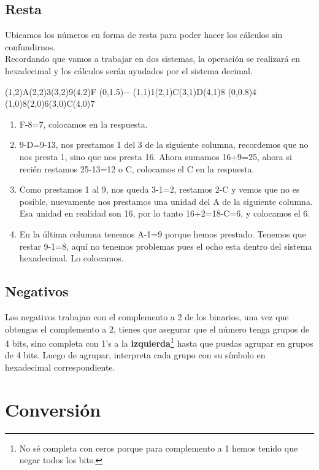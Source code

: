 \documentclass[
	12pt, %
	fleqn, %
	a4paper, %
]{LegrandOrangeBook}
\begin{document}
\subsection{Resta}
\begin{example}
Ubicamos los números en forma de resta para poder hacer los cálculos sin confundirnos.\\Recordando que vamos a trabajar en dos sistemas, la operación se realizará en hexadecimal y los cálculos serán ayudados por el sistema decimal.
\begin{center}
\par\vspace{2\oplineheight}
\oplput(1,2){A}\oplput(2,2){3}\oplput(3,2){9}\oplput(4,2){F}
\oplput(0,1.5){$-$}
\oplput(1,1){1}\oplput(2,1){C}\oplput(3,1){D}\oplput(4,1){8}
\ophline(0,0.8){4}
\oplput(1,0){8}\oplput(2,0){6}\oplput(3,0){C}\oplput(4,0){7}
\end{center}
\begin{enumerate}
\item F-8=7, colocamos en la respuesta.
\item 9-D=9-13, nos prestamos 1 del 3 de la siguiente columna, recordemos que no nos presta 1, sino que nos presta 16. Ahora sumamos 16+9=25, ahora si recién restamos 25-13=12 o C, colocamos el C en la respuesta.
\item Como prestamos 1 al 9, nos queda 3-1=2, restamos 2-C y vemos que no es posible, nuevamente nos prestamos una unidad del A de la siguiente columna. Esa unidad en realidad son 16, por lo tanto 16+2=18-C=6, y colocamos el 6.
\item En la última columna tenemos A-1=9 porque hemos prestado. Tenemos que restar 9-1=8, aquí no tenemos problemas pues el ocho esta dentro del sistema hexadecimal. Lo colocamos.
\end{enumerate}
\end{example}
\subsection{Negativos}
Los negativos trabajan con el complemento a 2 de los binarios, una vez que obtengas el complemento a 2, tienes que asegurar que el número tenga grupos de 4 bits, sino completa con 1's a la \textbf{izquierda}\footnote{No sé completa con ceros porque para complemento a 1 hemos tenido que negar todos los bits.} hasta que puedas agrupar en grupos de 4 bits. Luego de agrupar, interpreta cada grupo con su símbolo en hexadecimal correspondiente.
\section{Conversión}
\end{document}
